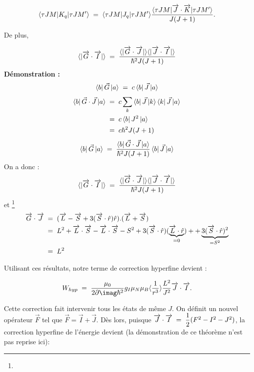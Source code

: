 \[
    \langle\tau JM|K_q|\tau JM'\rangle \; = \;   \langle\tau JM|J_q|\tau JM'\rangle\dfrac{ \langle\tau JM|\overrightarrow{J}\cdot\overrightarrow{K}|\tau JM'\rangle}{J(J+1)}.
\]

De plus,

\[
    \langle |\overrightarrow{G}\cdot\overrightarrow{I}| \rangle \; = \;  \dfrac{\langle |\overrightarrow{G}\cdot\overrightarrow{J}| \rangle\langle |\overrightarrow{J}\cdot\overrightarrow{I}| \rangle}{\hbar^2J(J+1)}
\]
\textbf{Démonstration :}\\
\[
    \bra{b}\vec{G}\ket{a}
    \; = \; c\bra{b}\vec{J}\ket{a}
\]
\begin{align*}
    \bra{b}\vec{G} \cdot \vec{J}\ket{a}
    &\; = \;  c\sum_k \bra{b}\vec{J}\ket{k}\bra{k}\vec{J}\ket{a}\\
    &\; = \;  c\bra{b}J^2\ket{a}\\
    &\; = \;  c\hbar^2 J(J+1)
\end{align*}
\[
    \bra{b}\vec{G}\ket{a} \; = \; \dfrac{\bra{b}\vec{G} \cdot \vec{J}\ket{a}}{\hbar^2 J(J+1)}\bra{b}\vec{J}\ket{a}
\]
On a donc :
\[
    \langle |\overrightarrow{G}\cdot\overrightarrow{I}| \rangle \; = \;  \dfrac{\langle |\overrightarrow{G}\cdot\overrightarrow{J}| \rangle\langle |\overrightarrow{J}\cdot\overrightarrow{I}| \rangle}{\hbar^2J(J+1)}
\]
et \footnote{}
\begin{align*}
    \overrightarrow{G}\cdot\overrightarrow{J}
    &\; = \;  (\overrightarrow{L}-\overrightarrow{S}+3(\overrightarrow{S}\cdot\hat{r})\hat{r}).(\overrightarrow{L}+\overrightarrow{S})\\
    &\; = \; L^2 + \overrightarrow{L}\cdot\overrightarrow{S} -\overrightarrow{L}\cdot\overrightarrow{S} - S^2 + 3 (\overrightarrow{S}\cdot\hat{r})(\underbrace{\overrightarrow{L}\cdot\hat{r}}_{= 0}) + +\underbrace{3(\overrightarrow{S}\cdot\hat{r})^2}_{=S^2}\\
    &\; = \;  L^2
\end{align*}

Utilisant ces résultats, notre terme de correction hyperfine devient :

\begin{equation}
    W_{hyp} \eq  \dfrac{\mu_0}{2\p\imag\hbar^2}g_I\mu_N\mu_B\langle\dfrac{1}{r^3}\rangle \dfrac{L^2}{J^2}\overrightarrow{J}\cdot\overrightarrow{I}.
\end{equation}

Cette correction fait intervenir tous les états de même $J$. On définit un nouvel opérateur $\vec{F}$ tel que $\vec{F} = \vec{I} + \vec{J}$. Dès lors, puisque $\overrightarrow{J}\cdot\overrightarrow{I} \; = \;  \dfrac{1}{2}(F^2-I^2-J^2)$, la correction hyperfine  de l'énergie devient (la démonstration de ce théorème n'est pas reprise ici):

